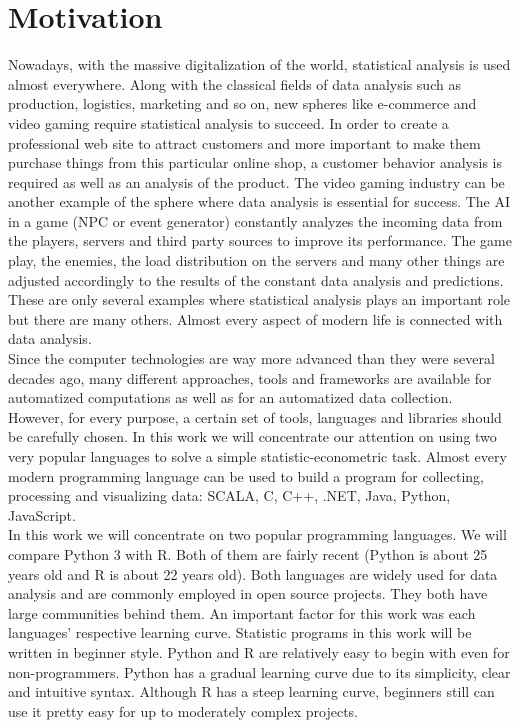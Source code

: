\documentclass [twoside,
  11pt, a4paper,
  footinclude=true,
  headinclude=true,
  cleardoublepage=empty
]{article}
\begin{document}
\newpage
\section{Motivation}
Nowadays, with the massive digitalization of the world, statistical analysis is used almost everywhere. Along with the classical fields of data analysis such as production, logistics, marketing and so on, new spheres like e-commerce and video gaming require statistical analysis to succeed. In order to create a professional web site to attract customers and more important to make them purchase things from this particular online shop, a customer behavior analysis is required as well as an analysis of the product. The video gaming industry can be another example of the sphere where data analysis is essential for success. The AI in a game (NPC or event generator) constantly analyzes the incoming data from the players, servers and third party sources to improve its performance. The game play, the enemies, the load distribution on the servers and many other things are adjusted accordingly to the results of the constant data analysis and predictions. These are only several examples where statistical analysis plays an important role but there are many others. Almost every aspect of modern life is connected with data analysis.\vspace{3mm}\\
Since the computer technologies are way more advanced than they were several decades ago, many different approaches, tools and frameworks are available for automatized computations as well as for an automatized data collection. However, for every purpose, a certain set of tools, languages and libraries should be carefully chosen. In this work we will concentrate our attention on using two very popular languages to solve a simple statistic-econometric task. Almost every modern programming language can be used to build a program for collecting, processing and visualizing data: SCALA, C, C++, .NET, Java, Python, JavaScript.\vspace{3mm}\\
In this work we will concentrate on two popular programming languages. We will compare Python 3 with R. Both of them are fairly recent (Python is about 25 years old and R is about 22 years old). Both languages are widely used for data analysis and are commonly employed in open source projects. They both have large communities behind them. An important factor for this work was each languages' respective learning curve. Statistic programs in this work will be written in beginner style. Python and R are relatively easy to begin with even for non-programmers. Python has a gradual learning curve due to its simplicity, clear and intuitive syntax. Although R has a steep learning curve, beginners still can use it pretty easy for up to moderately complex projects.
\end{document}
